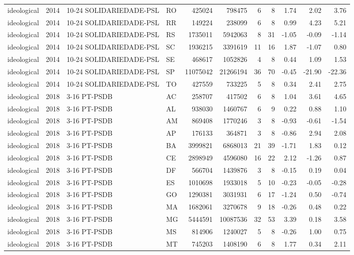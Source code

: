\begin{landscape}
\begin{longtable}{lllL{1.4cm}rrrrrrr}
ideological & 2014 & 10-24 SOLIDARIEDADE-PSL & RO & 425024 & 798475 & 6 & 8 & 1.74 & 2.02 & 3.76 \\
ideological & 2014 & 10-24 SOLIDARIEDADE-PSL & RR & 149224 & 238099 & 6 & 8 & 0.99 & 4.23 & 5.21 \\
ideological & 2014 & 10-24 SOLIDARIEDADE-PSL & RS & 1735011 & 5942063 & 8 & 31 & -1.05 & -0.09 & -1.14 \\
ideological & 2014 & 10-24 SOLIDARIEDADE-PSL & SC & 1936215 & 3391619 & 11 & 16 & 1.87 & -1.07 & 0.80 \\
ideological & 2014 & 10-24 SOLIDARIEDADE-PSL & SE & 468617 & 1052826 & 4 & 8 & 0.44 & 1.09 & 1.53 \\
ideological & 2014 & 10-24 SOLIDARIEDADE-PSL & SP & 11075042 & 21266194 & 36 & 70 & -0.45 & -21.90 & -22.36 \\
ideological & 2014 & 10-24 SOLIDARIEDADE-PSL & TO & 427559 & 733225 & 5 & 8 & 0.34 & 2.41 & 2.75 \\
ideological & 2018 & 3-16 PT-PSDB & AC & 258707 & 417502 & 6 & 8 & 1.04 & 3.61 & 4.65 \\
ideological & 2018 & 3-16 PT-PSDB & AL & 938030 & 1460767 & 6 & 9 & 0.22 & 0.88 & 1.10 \\
ideological & 2018 & 3-16 PT-PSDB & AM & 869408 & 1770246 & 3 & 8 & -0.93 & -0.61 & -1.54 \\
ideological & 2018 & 3-16 PT-PSDB & AP & 176133 & 364871 & 3 & 8 & -0.86 & 2.94 & 2.08 \\
ideological & 2018 & 3-16 PT-PSDB & BA & 3999821 & 6868013 & 21 & 39 & -1.71 & 1.83 & 0.12 \\
ideological & 2018 & 3-16 PT-PSDB & CE & 2898949 & 4596080 & 16 & 22 & 2.12 & -1.26 & 0.87 \\
ideological & 2018 & 3-16 PT-PSDB & DF & 566704 & 1439876 & 3 & 8 & -0.15 & 0.19 & 0.04 \\
ideological & 2018 & 3-16 PT-PSDB & ES & 1010698 & 1933018 & 5 & 10 & -0.23 & -0.05 & -0.28 \\
ideological & 2018 & 3-16 PT-PSDB & GO & 1290381 & 3031931 & 6 & 17 & -1.24 & 0.50 & -0.74 \\
ideological & 2018 & 3-16 PT-PSDB & MA & 1682061 & 3270678 & 9 & 18 & -0.26 & 0.48 & 0.22 \\
ideological & 2018 & 3-16 PT-PSDB & MG & 5444591 & 10087536 & 32 & 53 & 3.39 & 0.18 & 3.58 \\
ideological & 2018 & 3-16 PT-PSDB & MS & 814906 & 1240027 & 5 & 8 & -0.26 & 1.00 & 0.75 \\
ideological & 2018 & 3-16 PT-PSDB & MT & 745203 & 1408190 & 6 & 8 & 1.77 & 0.34 & 2.11 \\

\end{longtable}
\end{landscape}
